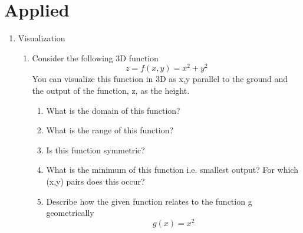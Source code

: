 \documentclass{article}
\begin{document}
\section{Applied}
\label{sec:Applied}
\begin{enumerate}

    \item Visualization
    \begin{enumerate}
        \item Consider the following 3D function
        \[ z = f(x,y) = x^2 + y^2\]
        You can visualize this function in 3D as x,y parallel to the ground and the output of the function, z, as the height.
        \begin{enumerate}
            \item What is the domain of this function?
            \item What is the range of this function?
            \item Is this function symmetric?
            \item What is the minimum of this function i.e. smallest output? For which (x,y) pairs does this occur?
            \item Describe how the given function relates to the function g geometrically
            \[ g(x) = x^2\]
        \end{enumerate}
    \end{enumerate}
    

\end{enumerate}
\end{document}
